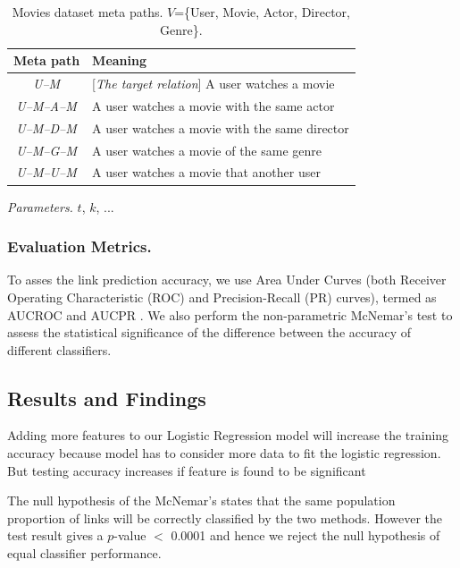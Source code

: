 \begin{table}[h]
\centering
\caption{Movies dataset meta paths. $V$=\{User, Movie, Actor, Director, Genre\}.}
\label{table_movies}\scriptsize
\begin{tabular}{|c|l|} \hline
\textbf{Meta path} & \textbf{Meaning} \\ \hline
\textit{U--M} & [\textit{The target relation}] A user watches a movie \\ \hline

\textit{U--M--A--M} & A user watches a movie with the same actor \\ \hline
\textit{U--M--D--M} & A user watches a movie with the same director \\ \hline
\textit{U--M--G--M} & A user watches a movie of the same genre \\ \hline
\textit{U--M--U--M} & A user watches a movie that another user  \\ \hline

\end{tabular}
\end{table}


\textit{Parameters.} $t$, $k$, ...


\subsubsection{Evaluation Metrics.} 

To asses the link prediction accuracy, we use Area Under Curves (both Receiver Operating Characteristic (ROC) and Precision-Recall (PR) curves), termed as AUCROC and AUCPR \cite{davis2006relationship}. We also perform the non-parametric McNemar's test \cite{mcnemar1947note} to assess the statistical significance of the difference between the accuracy of different classifiers.


\subsection{Results and Findings}

Adding more features to our Logistic Regression model will increase the training accuracy because model has to consider more data to fit the logistic regression. But testing accuracy increases if feature is found to be significant

The null hypothesis of the McNemar's states that the same population proportion of links will be correctly classified by the two methods. However the test result gives a $p$-value $<$ 0.0001 and hence we reject the null hypothesis of equal classifier performance.

